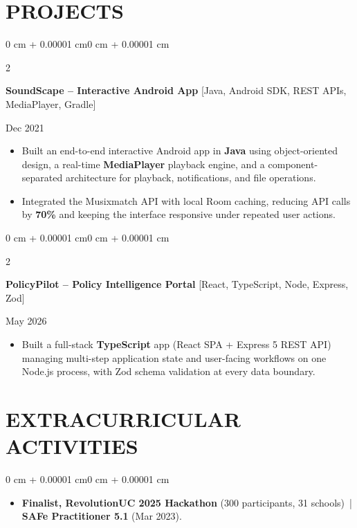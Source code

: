 \documentclass[10pt, letterpaper]{article}
\newenvironment{highlights}{
    \begin{itemize}[
        topsep=0.10 cm,
        parsep=0.06 cm,
        partopsep=0pt,
        itemsep=0.06 cm,
        leftmargin=12pt
    ]
}{
    \end{itemize}
}
\newenvironment{onecolentry}{
    \begin{adjustwidth}{0 cm + 0.00001 cm}{0 cm + 0.00001 cm}
}{
    \end{adjustwidth}
}
\newenvironment{twocolentry}[2][]{
    \onecolentry
    \def\secondColumn{#2}
    \setcolumnwidth{\fill, 4.5 cm}
    \begin{paracol}{2}
}{
    \switchcolumn \raggedleft \secondColumn
    \end{paracol}
    \endonecolentry
}
\begin{document}
\section{PROJECTS}
\begin{twocolentry}{Dec 2021}
\textbf{SoundScape -- Interactive Android App} [Java, Android SDK, REST APIs, MediaPlayer, Gradle]
\end{twocolentry}
\begin{highlights}
  \item Built an end-to-end interactive Android app in \textbf{Java} using object-oriented design, a real-time \textbf{MediaPlayer} playback engine, and a component-separated architecture for playback, notifications, and file operations.
  \item Integrated the Musixmatch API with local Room caching, reducing API calls by \textbf{70\%} and keeping the interface responsive under repeated user actions.
\end{highlights}

\vspace{0.12 cm}

\begin{twocolentry}{May 2026}
\textbf{PolicyPilot -- Policy Intelligence Portal} [React, TypeScript, Node, Express, Zod]
\end{twocolentry}
\begin{highlights}
  \item Built a full-stack \textbf{TypeScript} app (React SPA + Express 5 REST API) managing multi-step application state and user-facing workflows on one Node.js process, with Zod schema validation at every data boundary.
\end{highlights}

\section{EXTRACURRICULAR ACTIVITIES}
\begin{onecolentry}
\begin{highlights}
  \item \textbf{Finalist, RevolutionUC 2025 Hackathon} (300 participants, 31 schools) \,|\, \textbf{SAFe Practitioner 5.1} (Mar 2023).
\end{highlights}
\end{onecolentry}
\end{document}
